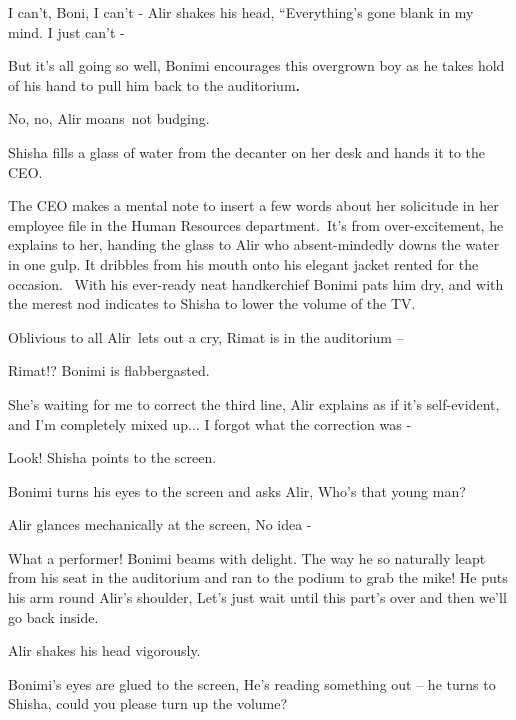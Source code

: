 \documentclass[twoside,11pt]{book}
\begin{document}
{\textquotedbl}I can't, Boni, I can't -{\textquotedbl} Alir shakes his head, ``Everything's gone blank in my mind. I
just can't -{\textquotedbl}~ 

{\textquotedbl}But it's all going so well,{\textquotedbl} Bonimi encourages this overgrown boy as he takes hold of his
hand to pull him back to the auditorium\textbf{. }

{\textquotedbl}No, no,{\textquotedbl} Alir moans~not budging.

Shisha fills a glass of water from the decanter on her desk and hands it to the CEO.

The CEO makes a mental note to insert a few words about her solicitude in her employee file in the Human Resources
department.\  {\textquotedbl}It's from over-excitement,{\textquotedbl} he explains to her, handing the glass to Alir
who absent-mindedly downs the water in one gulp. It dribbles from his mouth onto his elegant jacket rented for the
occasion. \ With his ever-ready neat handkerchief Bonimi pats him dry, and with the merest nod indicates to Shisha to
lower the volume of the TV.

Oblivious to all Alir~lets out a cry, {\textquotedbl}Rimat is in the auditorium --{\textquotedbl} 

{\textquotedbl}Rimat!?{\textquotedbl} Bonimi is flabbergasted. \ 

{\textquotedbl}She's waiting for me to correct the third line,{\textquotedbl} Alir explains as if it's self-evident,
{\textquotedbl}and I'm completely mixed up... I forgot what the correction was -{\textquotedbl}

{\textquotedbl}Look!{\textquotedbl} Shisha points to the screen.

Bonimi turns his eyes to the screen and asks Alir, {\textquotedbl}Who's that young man?{\textquotedbl} 

Alir glances mechanically at the screen, {\textquotedbl}No idea -{\textquotedbl}

{\textquotedbl}What a performer!{\textquotedbl} Bonimi beams with delight. {\textquotedbl}The way he so naturally leapt
from his seat in the auditorium and ran to the podium to grab the mike!{\textquotedbl} He puts his arm round Alir's
shoulder, {\textquotedbl}Let's just wait until this part's over and then we'll go back inside.{\textquotedbl} 

Alir shakes his head vigorously.\ 

Bonimi's eyes are glued to the screen, {\textquotedbl}He's reading something out --{\textquotedbl} he turns to Shisha,
{\textquotedbl}could you please turn up the volume?{\textquotedbl}\ 
\end{document}
